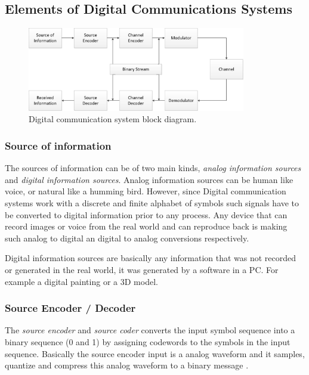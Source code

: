 \subsection{Elements of Digital Communications Systems}

\begin{figure}[htbp]
    \centering
    \includegraphics[width=0.85\textwidth]{./figures/digicom_bd}
    \caption{ Digital communication system block diagram.
    \label{fig:digcombd}}
\end{figure}

\subsubsection{Source of information}

The sources of information can be of two main kinds, \emph{analog information
sources} and \emph{digital information sources}. Analog information sources can
be human like voice, or natural like a humming bird. However, since Digital
communication systems work with a discrete and finite alphabet of symbols such
signals have to be converted to digital information prior to any process. Any
device that can record images or voice from the real world and can reproduce
back is making such analog to digital an digital to analog conversions
respectively.

Digital information sources are basically any information that was not
recorded or generated in the real world, it was generated by a software in a
PC. For example a digital painting or a 3D model.

\subsubsection{Source Encoder / Decoder}

The \emph{source encoder}  and \emph{source coder} converts the input symbol
sequence into a binary sequence (0 and 1) by assigning codewords to the symbols
in the input sequence. Basically the source encoder input is a analog waveform
and it samples, quantize and compress this analog waveform to a binary message
\cite{ocw:digicomm}.

